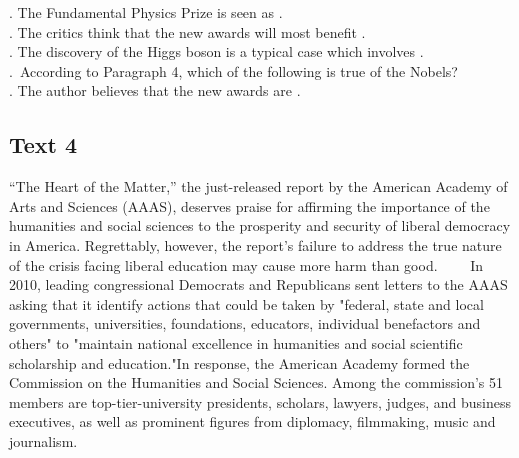 \begin{questions} . The Fundamental Physics Prize is seen as \ltk{}.
\\ . The critics think that the new awards will most benefit \ltk{}.
\\ . The discovery of the Higgs boson is a typical case which involves \ltk{}.
\\ . According to Paragraph 4, which of the following is true of the Nobels?
\\ . The author believes that the new awards are \ltk{}.
\\ \end{questions}      \subsection{Text 4}
“The Heart of the Matter,” the just-released report by the American Academy of Arts and Sciences (AAAS), deserves praise for affirming the importance of the humanities and social sciences to the prosperity and security of liberal democracy in America. Regrettably, however, the report's failure to address the true nature of the crisis facing liberal education may cause more harm than good.
　　In 2010, leading congressional Democrats and Republicans sent letters to the AAAS asking that it identify actions that could be taken by "federal, state and local governments, universities, foundations, educators, individual benefactors and others" to "maintain national excellence in humanities and social scientific scholarship and education."In response, the American Academy formed the Commission on the Humanities and Social Sciences. Among the commission's 51 members are top-tier-university presidents, scholars, lawyers, judges, and business executives, as well as prominent figures from diplomacy, filmmaking, music and journalism.
